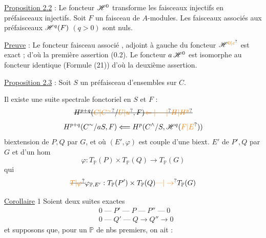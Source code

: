 \uline{Proposition 2.2} : Le foncteur $\mathscr H^0$ transforme les faisceaux injectifs en préfaisceaux injectifs. Soit $F$ un faisceau de $A$-modules. Les faisceaux associés aux préfaisceaux $\mathscr H^q(F)$ $(q>0)$ sont nuls.

\uline{Preuve} : Le foncteur faisceau associé , adjoint à gauche du foncteur $\handwritten{\mathscr H^{\unsure{0|c}}}$ est exact ; d'où la première assertion (0.2). Le foncteur $a\,\mathscr H^0$ est isomorphe au foncteur identique (Formule (21)) d'où la deuxième assertion.

\uline{Proposition 2.3} : Soit $S$ un préfaisceau d'ensembles sur $C$.

Il existe une suite spectrale fonctoriel en $S$ et $F$ :
\[
\deleted{H^{p+q}(\unsure{C|C^\sim}/\unsure{U|u},F)\unsure{\Leftarrow|\mathbin{\text{---}}|{}}\unsure{H|H^p}}
\]
\[
H^{p+q}(C^{\handwritten{\sim}}/aS,F)\handwritten{\Longleftarrow}H^p(C^{\handwritten{\wedge}}/S,\handwritten{\mathscr H^q}(\unsure{F|E}))
\]
biextension  de $P,Q$ par $G$, et où $(E',\varphi)$ est  couple d'une biext. $E'$ de $P',Q$ par $G$ et d'un hom
\[
\varphi:T_{\mathbb P}(P)\times T_{\mathbb P}(Q)\to T_{\mathbb P}(G)
\]
qui  
\[
\deleted{\unsure{T|\varphi}}\varphi_{\mathbb P,E'}:T_{\mathbb P}(P')\times T_{\mathbb P}(Q)\unsure{\mathbin{\text{---}}|\to}T_{\mathbb P}(G)
\]


\uline{Corollaire} 1 Soient deux suites exactes
\[
\begin{aligned}
&0\mathbin{\text{---}}P'\mathbin{\text{---}}P\mathbin{\text{---}}P''\mathbin{\text{---}}0\\
&0\mathbin{\text{---}}Q'\mathbin{\text{---}}Q\to Q''\to0
\end{aligned}
\]
et supposons que, pour un $\mathbb P$ de nbs premiers, on ait :

